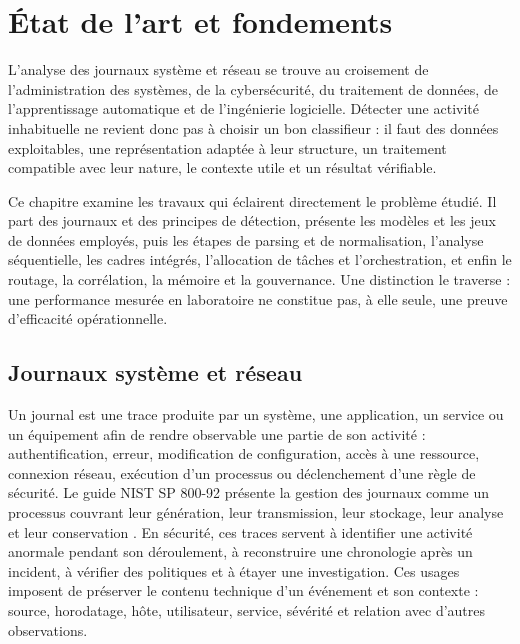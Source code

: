 \chapter{État de l'art et fondements}

\label{chap:etat-art}

L'analyse des journaux système et réseau se trouve au croisement de l'administration des systèmes, de la cybersécurité, du traitement de données, de l'apprentissage automatique et de l'ingénierie logicielle. Détecter une activité inhabituelle ne revient donc pas à choisir un bon classifieur : il faut des données exploitables, une représentation adaptée à leur structure, un traitement compatible avec leur nature, le contexte utile et un résultat vérifiable.

Ce chapitre examine les travaux qui éclairent directement le problème étudié. Il part des journaux et des principes de détection, présente les modèles et les jeux de données employés, puis les étapes de parsing et de normalisation, l'analyse séquentielle, les cadres intégrés, l'allocation de tâches et l'orchestration, et enfin le routage, la corrélation, la mémoire et la gouvernance. Une distinction le traverse : une performance mesurée en laboratoire ne constitue pas, à elle seule, une preuve d'efficacité opérationnelle.

\section{Journaux système et réseau}

Un journal est une trace produite par un système, une application, un service ou un équipement afin de rendre observable une partie de son activité : authentification, erreur, modification de configuration, accès à une ressource, connexion réseau, exécution d'un processus ou déclenchement d'une règle de sécurité. Le guide NIST SP 800-92 présente la gestion des journaux comme un processus couvrant leur génération, leur transmission, leur stockage, leur analyse et leur conservation \cite{nist80092}. En sécurité, ces traces servent à identifier une activité anormale pendant son déroulement, à reconstruire une chronologie après un incident, à vérifier des politiques et à étayer une investigation. Ces usages imposent de préserver le contenu technique d'un événement et son contexte : source, horodatage, hôte, utilisateur, service, sévérité et relation avec d'autres observations.

